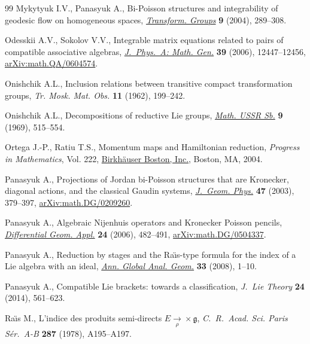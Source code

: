 \documentclass[11pt]{article}
\numberwithin{equation}{section}
\begin{document}
\begin{thebibliography}{99}
Mykytyuk I.V., Panasyuk A., Bi-{P}oisson structures and integrability of
 geodesic flow on homogeneous spaces, \href{https://doi.org/10.1007/s00031-004-7015-1}{\textit{Transform. Groups}} \textbf{9}
 (2004), 289--308.

Odesskii A.V., Sokolov V.V., Integrable matrix equations related to pairs of
 compatible associative algebras, \href{https://doi.org/10.1088/0305-4470/39/40/011}{\textit{J.~Phys.~A: Math. Gen.}} \textbf{39}
 (2006), 12447--12456, \href{https://arxiv.org/abs/math.QA/0604574}{arXiv:math.QA/0604574}.

Onishchik A.L., Inclusion relations between transitive compact transformation
 groups, \textit{Tr. Mosk. Mat. Obs.} \textbf{11} (1962), 199--242.

Onishchik A.L., Decompositions of reductive {L}ie groups, \href{https://doi.org/10.1070/SM1969v009n04ABEH001292}{\textit{Math. USSR
 Sb.}} \textbf{9} (1969), 515--554.

Ortega J.-P., Ratiu T.S., Momentum maps and {H}amiltonian reduction,
 \textit{Progress in Mathematics}, Vol. 222, \href{https://doi.org/10.1007/978-1-4757-3811-7}{Birkh\"{a}user Boston, Inc.},
 Boston, MA, 2004.

Panasyuk A., Projections of {J}ordan bi-{P}oisson structures that are
 {K}ronecker, diagonal actions, and the classical {G}audin systems,
 \href{https://doi.org/10.1016/S0393-0440(02)00228-0}{\textit{J.~Geom. Phys.}} \textbf{47} (2003), 379--397,
 \href{https://arxiv.org/abs/math.DG/0209260}{arXiv:math.DG/0209260}.

Panasyuk A., Algebraic {N}ijenhuis operators and {K}ronecker {P}oisson pencils,
 \href{https://doi.org/10.1016/j.difgeo.2006.05.009}{\textit{Differential Geom. Appl.}} \textbf{24} (2006), 482--491,
 \href{https://arxiv.org/abs/math.DG/0504337}{arXiv:math.DG/0504337}.

Panasyuk A., Reduction by stages and the {R}a\"{\i}s-type formula for the index
 of a {L}ie algebra with an ideal, \href{https://doi.org/10.1007/s10455-007-9070-z}{\textit{Ann. Global Anal. Geom.}}
 \textbf{33} (2008), 1--10.

Panasyuk A., Compatible {L}ie brackets: towards a classification,
 \textit{J.~Lie Theory} \textbf{24} (2014), 561--623.

Ra\"{\i}s M., L'indice des produits semi-directs {$E\underset
 \rho\to\times{\mathfrak g}$}, \textit{C.~R.~Acad. Sci. Paris S\'{e}r.~A-B}
 \textbf{287} (1978), A195--A197.


\end{thebibliography}
\end{document}
